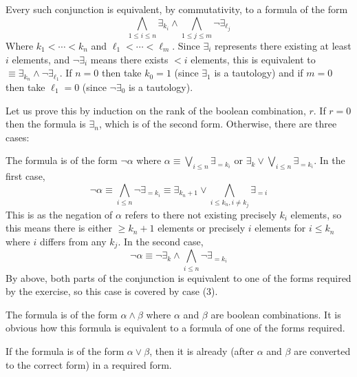 \eexerc

\benum
    \item Every such conjunction is equivalent, by commutativity, to a formula of the form
    $$ \bigwedge_{1\leq i\leq n}\exists_{k_i}\land\bigwedge_{1\leq j\leq m}\neg\exists_{\ell_j} $$
    Where $k_1<\cdots<k_n$ and $\ell_1<\cdots<\ell_m$.
    Since $\exists_i$ represents there existing at least $i$ elements, and $\neg\exists_i$ means there exists $<i$ elements, this is equivalent to $\equiv\exists_{k_n}\land\neg\exists_{\ell_1}$.
    If $n=0$ then take $k_0=1$ (since $\exists_1$ is a tautology) and if $m=0$ then take $\ell_1=0$ (since $\neg\exists_0$ is a tautology).

    \item Let us prove this by induction on the rank of the boolean combination, $r$.
    If $r=0$ then the formula is $\exists_n$, which is of the second form.
    Otherwise, there are three cases:
    \benum
        \item The formula is of the form $\neg\alpha$ where $\alpha\equiv\bigvee_{i\leq n}\exists_{=k_i}$ or $\exists_k\lor\bigvee_{i\leq n}\exists_{=k_i}$.
        In the first case,
        $$ \neg\alpha \equiv \bigwedge_{i\leq n}\neg\exists_{=k_i} \equiv \exists_{k_n+1}\lor\bigwedge_{i\leq k_n,i\neq k_j}\exists_{=i} $$
        This is as the negation of $\alpha$ refers to there not existing precisely $k_i$ elements, so this means there is either $\geq k_n+1$ elements or precisely $i$ elements for $i\leq k_n$ where
        $i$ differs from any $k_j$.
        In the second case,
        $$ \neg\alpha \equiv \neg\exists_k\land\bigwedge_{i\leq n}\neg\exists_{=k_i} $$
        By above, both parts of the conjunction is equivalent to one of the forms required by the exercise, so this case is covered by case (3).
        \item The formula is of the form $\alpha\land\beta$ where $\alpha$ and $\beta$ are boolean combinations.
        It is obvious how this formula is equivalent to a formula of one of the forms required.
        \item If the formula is of the form $\alpha\lor\beta$, then it is already (after $\alpha$ and $\beta$ are converted to the correct form) in a required form.
    \eenum
\eenum

